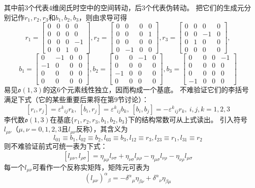 \begin{example}
    其中前$3$个代表$4$维闵氏时空中的空间转动，后$3$个代表伪转动。
    把它们的生成元分别记作$r_1, r_2, r_3$和$b_1, b_2, b_3$，则由求导可得
    $$r_1 = \begin{bmatrix}
        0 & 0 & 0 & 0 \\
        0 & 0 & 0 & 0 \\
        0 & 0 & 0 & -1 \\
        0 & 0 & 1 & 0
    \end{bmatrix}, r_2 = \begin{bmatrix}
        0 & 0 & 0 & 0 \\
        0 & 0 & 0 & 1 \\
        0 & 0 & 0 & 0 \\
        0 & -1 & 0 & 0
    \end{bmatrix}, r_3 = \begin{bmatrix}
        0 & 0 & 0 & 0 \\
        0 & 0 & -1 & 0 \\
        0 & 1 & 0 & 0 \\
        0 & 0 & 0 & 0
    \end{bmatrix},$$
    $$b_1 = \begin{bmatrix}
        0 & -1 & 0 & 0 \\
        -1 & 0 & 0 & 0 \\
        0 & 0 & 0 & 0 \\
        0 & 0 & 0 & 0
    \end{bmatrix}, b_2 = \begin{bmatrix}
        0 & 0 & -1 & 0 \\
        0 & 0 & 0 & 0 \\
        -1 & 0 & 0 & 0 \\
        0 & 0 & 0 & 0
    \end{bmatrix}, b_3 = \begin{bmatrix}
        0 & 0 & 0 & -1 \\
        0 & 0 & 0 & 0 \\
        0 & 0 & 0 & 0 \\
        -1 & 0 & 0 & 0
    \end{bmatrix}$$
    易见$\mathfrak{o}(1, 3)$的这$6$个元素线性独立，因而构成一个基底。
    不难验证它们的李括号满足下式（它的某些重要后果将在第$9$节讨论）：
    $$[r_i, r_j] = \varepsilon^k{}_{ij}r_k, ~ [b_i, r_j] = \varepsilon^k{}_{ij}b_k, ~ [b_i, b_j] = -\varepsilon^k{}_{ij}r_k, ~ i, j, k = 1, 2, 3$$
    李代数$\mathfrak{o}(1, 3)$在基底$\{r_1, r_2, r_3, b_1, b_2, b_3\}$下的结构常数可从上式读出。
    引入符号$l_{\mu\nu}$（$\mu, \nu = 0, 1, 2, 3$且$l_{\mu\nu}$反称），其含义为
    $$l_{01} \equiv b_1, l_{02} \equiv b_2, l_{03} \equiv b_3, l_{12} \equiv r_3, l_{23} \equiv r_1, l_{31} \equiv r_2$$
    则不难验证前式可统一表为下式：
    $$[l_{\mu\nu}, l_{\rho\sigma}] = \eta_{\mu\rho}l_{\nu\sigma} + \eta_{\nu\sigma}l_{\mu\rho} - \eta_{\mu\sigma}l_{\nu\rho} - \eta_{\nu\rho}l_{\mu\sigma}$$
    每一个$l_{\mu\nu}$可看作一个反称实矩阵，矩阵元可表为
    $$(l_{\mu\nu})^\alpha{}_\beta = -\delta^\alpha{}_\mu\eta_{\beta\nu} + \delta^\alpha{}_\nu\eta_{\beta\mu}$$
\end{example}

